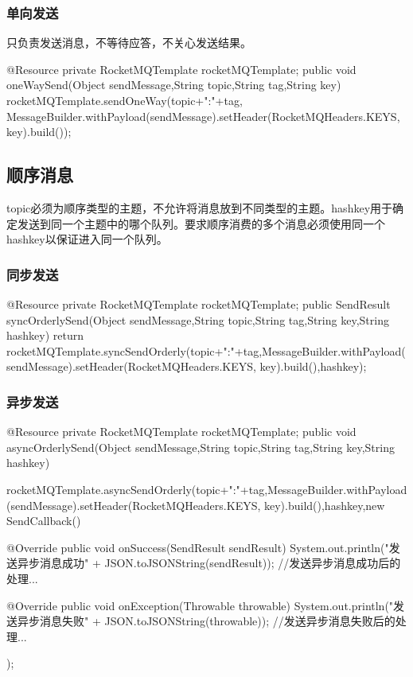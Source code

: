 \documentclass[11pt, a4paper, oneside, fontset=none]{ctexbook}
\begin{document}
\subsubsection{单向发送}
只负责发送消息，不等待应答，不关心发送结果。
\begin{java}[caption=普通消息单向发送方式]
@Resource
private RocketMQTemplate rocketMQTemplate;
public void oneWaySend(Object sendMessage,String topic,String tag,String key) {
  rocketMQTemplate.sendOneWay(topic+":"+tag, MessageBuilder.withPayload(sendMessage).setHeader(RocketMQHeaders.KEYS, key).build());
}
\end{java}

\subsection{顺序消息}
topic必须为顺序类型的主题，不允许将消息放到不同类型的主题。hashkey用于确定发送到同一个主题中的哪个队列。要求顺序消费的多个消息必须使用同一个hashkey以保证进入同一个队列。
\subsubsection{同步发送}
\begin{java}[caption=顺序消息同步发送方式]
@Resource
private RocketMQTemplate rocketMQTemplate;
public SendResult syncOrderlySend(Object sendMessage,String topic,String tag,String key,String hashkey) {
  return rocketMQTemplate.syncSendOrderly(topic+":"+tag,MessageBuilder.withPayload(sendMessage).setHeader(RocketMQHeaders.KEYS, key).build(),hashkey);
}
\end{java}
\subsubsection{异步发送}
\begin{java}[caption=顺序消息异步发送方式]
@Resource
private RocketMQTemplate rocketMQTemplate;
public void asyncOrderlySend(Object sendMessage,String topic,String tag,String key,String hashkey) {
  rocketMQTemplate.asyncSendOrderly(topic+":"+tag,MessageBuilder.withPayload(sendMessage).setHeader(RocketMQHeaders.KEYS, key).build(),hashkey,new SendCallback() {
    @Override
    public void onSuccess(SendResult sendResult) {
      System.out.println("发送异步消息成功" + JSON.toJSONString(sendResult));
      //发送异步消息成功后的处理...
    }

    @Override
    public void onException(Throwable throwable) {
      System.out.println("发送异步消息失败" + JSON.toJSONString(throwable));
      //发送异步消息失败后的处理...
    }
  });
}
\end{java}

\end{document}
